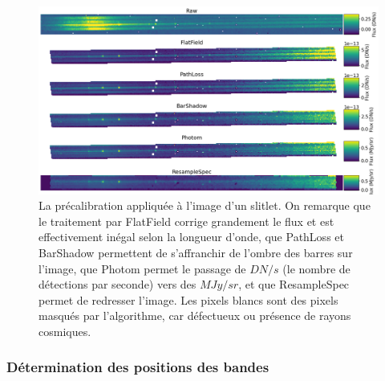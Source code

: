 \documentclass[11pt, a4paper]{article}
\begin{document}
\begin{figure}[H]
  \centering
  \includegraphics[scale=0.45]{assets/precal.png}
  \caption{La précalibration appliquée à l'image d'un slitlet. On remarque que le traitement par FlatField corrige grandement le flux et est effectivement inégal selon la longueur d'onde, que PathLoss et BarShadow permettent de s'affranchir de l'ombre des barres sur l'image, que Photom permet le passage de $DN/s$ (le nombre de détections par seconde) vers des $MJy/sr$, et que ResampleSpec permet de redresser l'image. Les pixels blancs sont des pixels masqués par l'algorithme, car défectueux ou présence de rayons cosmiques.}
  \label{fig:precal}
\end{figure}


\subsubsection{Détermination des positions des bandes}
\end{document}
